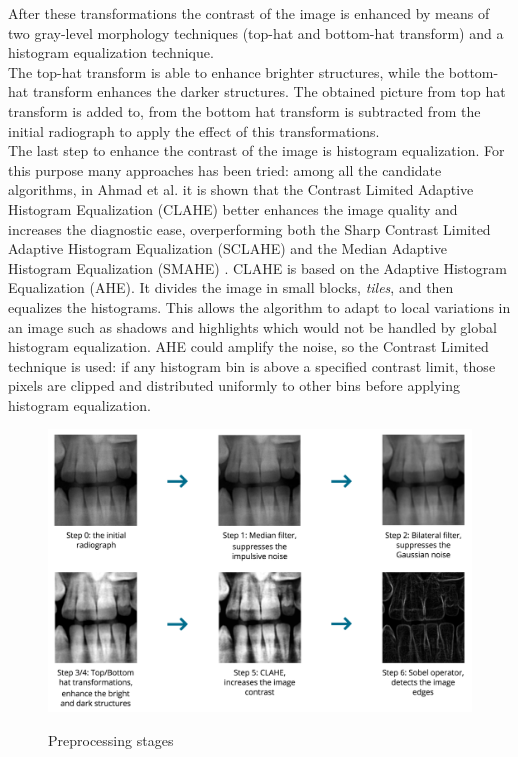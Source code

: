 \documentclass[a4paper]{article}
\begin{document}
After these transformations the contrast of the image is enhanced by means of two gray-level morphology techniques (top-hat and bottom-hat transform) and a histogram equalization technique. \\
The top-hat transform is able to enhance brighter structures, while the bottom-hat transform enhances the darker structures. The obtained picture from top hat transform is added to, from the bottom hat transform is subtracted from the initial radiograph to apply the effect of this transformations. \\
The last step to enhance the contrast of the image is histogram equalization. For this purpose many approaches has been tried: among all the candidate algorithms, in Ahmad et al. it is shown that the Contrast Limited Adaptive Histogram Equalization (CLAHE) better enhances the image quality and increases the diagnostic ease, overperforming both the Sharp Contrast Limited Adaptive Histogram Equalization (SCLAHE) and the Median Adaptive Histogram Equalization (SMAHE) \cite{ahmad}.
CLAHE is based on the Adaptive Histogram Equalization (AHE). It divides the image in small blocks, \textit{tiles}, and then equalizes the histograms. This allows the algorithm to adapt to local variations in an image such as shadows and highlights which would not be handled by global histogram equalization. AHE could amplify the noise, so the Contrast Limited technique is used: if any histogram bin is above a specified contrast limit, those pixels are clipped and distributed uniformly to other bins before applying histogram equalization. 

\begin{figure}[htp] 
    \centering
    \includegraphics[width=15cm]{preprocessing}
    \label{fig:bilateral}
    \caption{Preprocessing stages}
\end{figure}
\end{document}
